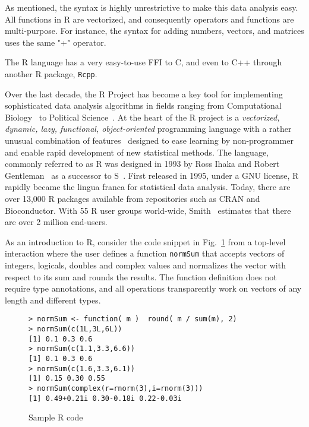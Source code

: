 \documentclass[acmsmall,10pt,review,anonymous]{acmart}\settopmatter{printfolios=true,printccs=false,printacmref=false}
\newcommand{\code}[1]{\lstinline|#1|\xspace}
\begin{document}
  As mentioned, the syntax is highly unrestrictive to make this
data analysis easy.  All functions in R are vectorized, and consequently
operators and functions are multi-purpose.  For instance, the syntax for
adding numbers, vectors, and matrices uses the same "+" operator.

The R language has a very easy-to-use FFI to C, and even to C++ through another R package, {\tt Rcpp}.


Over the last decade, the R Project has become a key tool for implementing
sophisticated data analysis algorithms in fields ranging from Computational
Biology~\cite{R05} to Political Science~\cite{R:Keele:2008}. At the heart of
the R project is a \emph{vectorized, dynamic, lazy, functional,
  object-oriented} programming language with a rather unusual combination of
features~\cite{ecoop12} designed to ease learning by non-programmer and
enable rapid development of new statistical methods.  The language, commonly
referred to as R was designed in 1993 by Ross Ihaka and Robert
Gentleman~\cite{R96} as a successor to S~\cite{S88}.  First released in
1995, under a GNU license, R rapidly became the lingua franca for
statistical data analysis. Today, there are over 13,000 R packages available
from repositories such as CRAN and Bioconductor.  With 55 R user groups
world-wide, Smith~\cite{eco11} estimates that there are over 2 million
end-users.


As an introduction to R, consider the code snippet in Fig.~\ref{sample} from
a top-level interaction where the user defines a function \code{normSum}
that accepts vectors of integers, logicals, doubles and complex values and
normalizes the vector with respect to its sum and rounds the results. The
function definition does not require type annotations, and all operations
transparently work on vectors of any length and different types.

\begin{figure}{\small
\begin{lstlisting}[style=R]
> normSum <- function( m )  round( m / sum(m), 2)
> normSum(c(1L,3L,6L))
[1] 0.1 0.3 0.6
> normSum(c(1.1,3.3,6.6))
[1] 0.1 0.3 0.6
> normSum(c(1.6,3.3,6.1))
[1] 0.15 0.30 0.55
> normSum(complex(r=rnorm(3),i=rnorm(3)))
[1] 0.49+0.21i 0.30-0.18i 0.22-0.03i
\end{lstlisting}}
\caption{Sample R code}\label{sample}
\end{figure}
\end{document}
